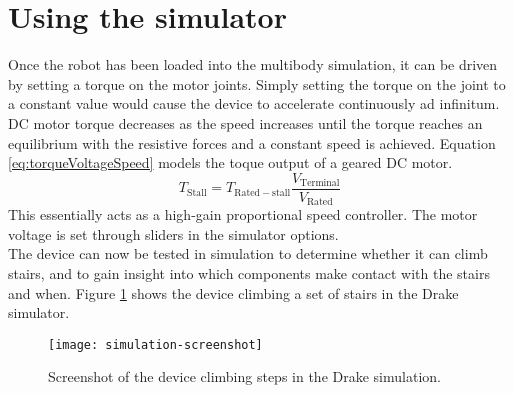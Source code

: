 \section{Using the simulator}
Once the robot has been loaded into the multibody simulation, it can be driven by setting a torque on the motor joints. Simply setting the torque on the joint to a constant value would cause the device to accelerate continuously ad infinitum. DC motor torque decreases as the speed increases until the torque reaches an equilibrium with the resistive forces and a constant speed is achieved. Equation \ref{eq:torqueVoltageSpeed} models the toque output of a geared DC motor.\\

\begin{equation}
	T_\mathrm{Stall} = T_\mathrm{Rated-stall}\frac{V_\mathrm{Terminal}}{V_\mathrm{Rated}} 
	\label{eq:torqueVoltageSpeed}
\end{equation}
This essentially acts as a high-gain proportional speed controller. The motor voltage is set through sliders in the simulator options. \\
The device can now be tested in simulation to determine whether it can climb stairs, and to gain insight into which components make contact with the stairs and when. Figure \ref{fig:simulation-screenshot} shows the device climbing a set of stairs in the Drake simulator.\\

\begin{figure}[h]
	\centering
	\texttt{[image: simulation-screenshot]}
	\caption{Screenshot of the device climbing steps in the Drake simulation.}
	\label{fig:simulation-screenshot}
\end{figure}
